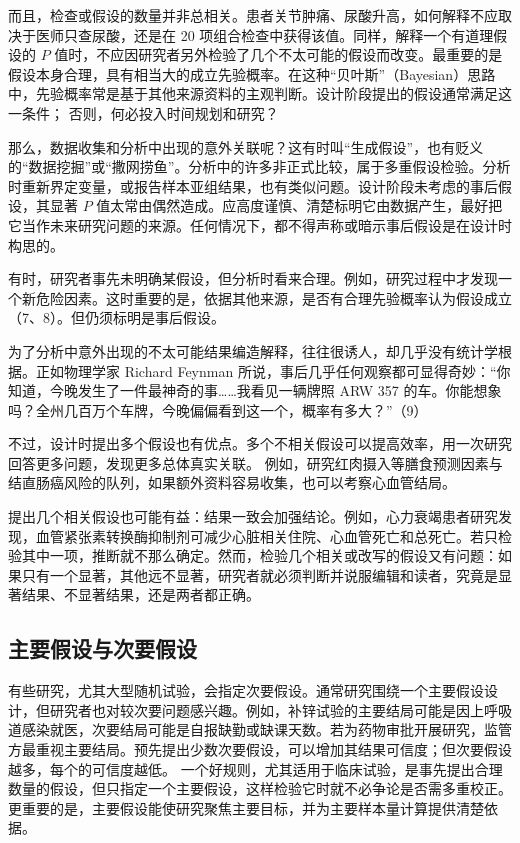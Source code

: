 而且，检查或假设的数量并非总相关。患者关节肿痛、尿酸升高，如何解释不应取决于医师只查尿酸，还是在 20 项组合检查中获得该值。同样，解释一个有道理假设的 $P$ 值时，不应因研究者另外检验了几个不太可能的假设而改变。最重要的是假设本身合理，具有相当大的成立先验概率。在这种“贝叶斯”（Bayesian）思路中，先验概率常是基于其他来源资料的主观判断。设计阶段提出的假设通常满足这一条件；
否则，何必投入时间规划和研究？

那么，数据收集和分析中出现的意外关联呢？这有时叫“生成假设”，也有贬义的“数据挖掘”或“撒网捞鱼”。分析中的许多非正式比较，属于多重假设检验。分析时重新界定变量，或报告样本亚组结果，也有类似问题。设计阶段未考虑的事后假设，其显著 $P$ 值太常由偶然造成。应高度谨慎、清楚标明它由数据产生，最好把它当作未来研究问题的来源。任何情况下，都不得声称或暗示事后假设是在设计时构思的。

有时，研究者事先未明确某假设，但分析时看来合理。例如，研究过程中才发现一个新危险因素。这时重要的是，依据其他来源，是否有合理先验概率认为假设成立（7、8）。但仍须标明是事后假设。

为了分析中意外出现的不太可能结果编造解释，往往很诱人，却几乎没有统计学根据。正如物理学家 Richard Feynman 所说，事后几乎任何观察都可显得奇妙：“你知道，今晚发生了一件最神奇的事……我看见一辆牌照 ARW 357 的车。你能想象吗？全州几百万个车牌，今晚偏偏看到这一个，概率有多大？”（9）

不过，设计时提出多个假设也有优点。多个不相关假设可以提高效率，用一次研究回答更多问题，发现更多总体真实关联。
例如，研究红肉摄入等膳食预测因素与结直肠癌风险的队列，如果额外资料容易收集，也可以考察心血管结局。

提出几个相关假设也可能有益：结果一致会加强结论。例如，心力衰竭患者研究发现，血管紧张素转换酶抑制剂可减少心脏相关住院、心血管死亡和总死亡。若只检验其中一项，推断就不那么确定。然而，检验几个相关或改写的假设又有问题：如果只有一个显著，其他远不显著，研究者就必须判断并说服编辑和读者，究竟是显著结果、不显著结果，还是两者都正确。

\subsection{主要假设与次要假设}
有些研究，尤其大型随机试验，会指定次要假设。通常研究围绕一个主要假设设计，但研究者也对较次要问题感兴趣。例如，补锌试验的主要结局可能是因上呼吸道感染就医，次要结局可能是自报缺勤或缺课天数。若为药物审批开展研究，监管方最重视主要结局。预先提出少数次要假设，可以增加其结果可信度；但次要假设越多，每个的可信度越低。
一个好规则，尤其适用于临床试验，是事先提出合理数量的假设，但只指定一个主要假设，这样检验它时就不必争论是否需多重校正。更重要的是，主要假设能使研究聚焦主要目标，并为主要样本量计算提供清楚依据。

